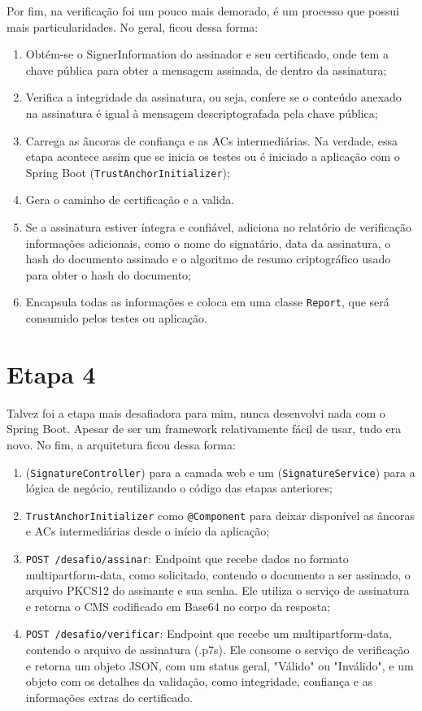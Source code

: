 \documentclass{article}
\begin{document}
    Por fim, na verificação foi um pouco mais demorado, é um processo que possui mais particularidades. No geral, ficou dessa forma:

    \begin{enumerate}
        \item Obtém-se o SignerInformation do assinador e seu certificado, onde tem a chave pública para obter a mensagem assinada, de dentro da assinatura;
        \item Verifica a integridade da assinatura, ou seja, confere se o conteúdo anexado na assinatura é igual à mensagem descriptografada pela chave pública;
        \item Carrega as âncoras de confiança e as ACs intermediárias. Na verdade, essa etapa acontece assim que se inicia os testes ou é iniciado a aplicação com o Spring Boot (\texttt{TrustAnchorInitializer});
        \item Gera o caminho de certificação e a valida.
        \item Se a assinatura estiver íntegra e confiável, adiciona no relatório de verificação informações adicionais, como o nome do signatário, data da assinatura, o hash do documento assinado e o algoritmo de resumo criptográfico usado para obter o hash do documento;
        \item Encapsula todas as informações e coloca em uma classe \texttt{Report}, que será consumido pelos testes ou aplicação.
    \end{enumerate}

    \section{Etapa 4}

    Talvez foi a etapa mais desafiadora para mim, nunca desenvolvi nada com o Spring Boot. Apesar de ser um framework relativamente fácil de usar, tudo era novo. No fim, a arquitetura ficou dessa forma:

    \begin{enumerate}
        \item (\texttt{SignatureController}) para a camada web e um (\texttt{SignatureService}) para a lógica de negócio, reutilizando o código das etapas anteriores;
        \item \texttt{TrustAnchorInitializer} como \texttt{@Component} para deixar disponível as âncoras e ACs intermediárias desde o início da aplicação;
        \item \texttt{POST /desafio/assinar}: Endpoint que recebe dados no formato multipart\/form-data, como solicitado, contendo o documento a ser assinado, o arquivo PKCS12 do assinante e sua senha. Ele utiliza o serviço de assinatura e retorna o CMS codificado em Base64 no corpo da resposta;
        \item \texttt{POST /desafio/verificar}: Endpoint que recebe um multipart\/form-data, contendo o arquivo de assinatura (.p7s). Ele consome o serviço de verificação e retorna um objeto JSON, com um status geral, "Válido" ou "Inválido", e um objeto com os detalhes da validação, como integridade, confiança e as informações extras do certificado.
    \end{enumerate}
\end{document}
